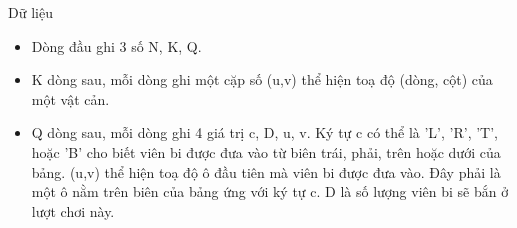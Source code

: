 Dữ liệu  
\begin{itemize}
	\item     Dòng đầu ghi 3 số N, K, Q.   
	\item     K dòng sau, mỗi dòng ghi một cặp số (u,v) thể hiện toạ độ (dòng, cột) của một vật cản.   
	\item     Q dòng sau, mỗi dòng ghi 4 giá trị c, D, u, v. Ký tự c có thể là 'L', 'R', 'T', hoặc 'B' cho biết viên bi được đưa vào từ biên trái, phải, trên hoặc dưới của bảng. (u,v) thể hiện toạ độ ô đầu tiên mà viên bi được đưa vào. Đây phải là một ô nằm trên biên của bảng ứng với ký tự c. D là số lượng viên bi sẽ bắn ở lượt chơi này.   
\end{itemize}